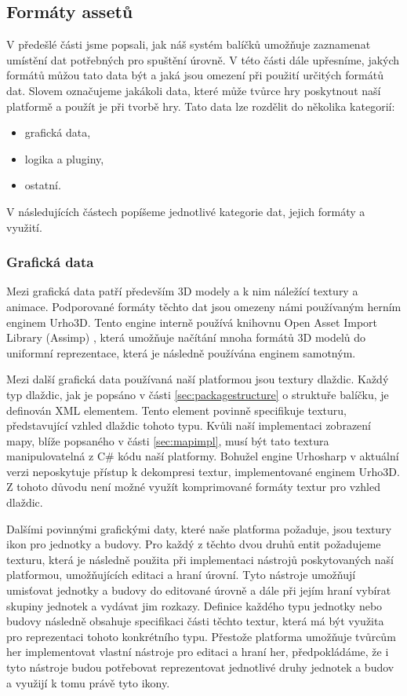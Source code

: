 \subsection{Formáty assetů}
V předešlé části jsme popsali, jak náš systém balíčků umožňuje zaznamenat umístění dat potřebných pro spuštění úrovně. V této části dále upřesníme, jakých formátů můžou tato data být a jaká jsou omezení při použití určitých formátů dat. Slovem \textit{ } označujeme jakákoli data, které může tvůrce hry poskytnout naší platformě a použít je při tvorbě hry. Tato data lze rozdělit do několika kategorií:
\begin{itemize}
	\item grafická data,
	\item logika a pluginy,
	\item ostatní.
\end{itemize}

V následujících částech popíšeme jednotlivé kategorie dat, jejich formáty a využití.

\subsubsection{Grafická data}
Mezi grafická data patří především 3D modely a k nim náležící textury a animace. Podporované formáty těchto dat jsou omezeny námi používaným herním enginem Urho3D. Tento engine interně používá knihovnu Open Asset Import Library (Assimp) \citep{site:assimp}, která umožňuje načítání mnoha formátů 3D modelů do uniformní reprezentace, která je následně používána enginem samotným.

Mezi další grafická data používaná naší platformou jsou textury dlaždic. Každý typ dlaždic, jak je popsáno v části \ref{sec:packagestructure} o struktuře balíčku, je definován XML elementem. Tento element povinně specifikuje texturu, představující vzhled dlaždic tohoto typu. Kvůli naší implementaci zobrazení mapy, blíže popsaného v části \ref{sec:mapimpl}, musí být tato textura manipulovatelná z C\# kódu naší platformy. Bohužel engine Urhosharp v aktuální verzi neposkytuje přístup k dekompresi textur, implementované enginem Urho3D. Z tohoto důvodu není možné využít komprimované formáty textur pro vzhled dlaždic.

Dalšími povinnými grafickými daty, které naše platforma požaduje, jsou textury ikon pro jednotky a budovy. Pro každý z těchto dvou druhů entit požadujeme texturu, která je následně použita při implementaci nástrojů  poskytovaných naší platformou, umožňujících editaci a hraní úrovní. Tyto nástroje umožňují umisťovat jednotky a budovy do editované úrovně a dále při jejím hraní vybírat skupiny jednotek a vydávat jim rozkazy. Definice každého typu jednotky nebo budovy následně obsahuje specifikaci části těchto textur, která má být využita pro reprezentaci tohoto konkrétního typu. Přestože platforma umožňuje tvůrcům her implementovat vlastní nástroje pro editaci a hraní her, předpokládáme, že i tyto nástroje budou potřebovat reprezentovat jednotlivé druhy jednotek a budov a využijí k tomu právě tyto ikony.

